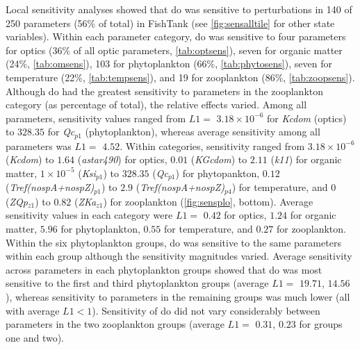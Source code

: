 \documentclass[letterpaper,12pt,oneside]{article}\usepackage[]{graphicx}\usepackage[]{color}
\begin{document}
Local sensitivity analyses showed that \ac{do} was sensitive to perturbations in 140 of 250 parameters (56\% of total) in FishTank (see \cref{fig:sensalltile} for other state variables). Within each parameter category, \ac{do} was sensitive to four parameters for optics (36\% of all optic parameters, \cref{tab:optsens}), seven for organic matter (24\%, \cref{tab:omsens}), 103 for phytoplankton (66\%, \cref{tab:phytosens}), seven for temperature (22\%, \cref{tab:tempsens}), and 19 for zooplankton (86\%, \cref{tab:zoopsens}). Although \ac{do} had the greatest sensitivity to parameters in the zooplankton category (as percentage of total), the relative effects varied. Among all parameters, sensitivity values ranged from $L1 = $ $3.18\times 10^{-6}$ for \textit{Kcdom} (optics) to $328.35$ for \textit{Qc$_{p1}$} (phytoplankton), whereas average sensitivity among all parameters was $L1 = $ $4.52$.  Within categories, sensitivity ranged from $3.18\times 10^{-6}$ (\textit{Kcdom}) to $1.64$ (\textit{astar490}) for optics, $0.01$ (\textit{KGcdom}) to $2.11$ (\textit{k11}) for organic matter, $1\times 10^{-5}$ (\textit{Ksi$_{p1}$}) to $328.35$ (\textit{Qc$_{p1}$}) for phytopankton, $0.12$ (\textit{Tref(nospA+nospZ)$_{p1}$}) to $2.9$ (\textit{Tref(nospA+nospZ)$_{p4}$}) for temperature, and $0$ (\textit{ZQp$_{z1}$}) to $0.82$ (\textit{ZKa$_{z1}$}) for zooplankton (\cref{fig:sensplo}, bottom).  Average sensitivity values in each category were $L1 = $ $0.42$ for optics, $1.24$ for organic matter, $5.96$ for phytoplankton, $0.55$ for temperature, and $0.27$ for zooplankton.  Within the six phytoplankton groups, \ac{do} was sensitive to the same parameters within each group although the sensitivity magnitudes varied. Average sensitivity across parameters in each phytoplankton groups showed that \ac{do} was most sensitive to the first and third phytoplankton groups (average $L1 = $ $19.71$, $14.56$), whereas sensitivity to parameters in the remaining groups was much lower (all with average $L1 < 1$). Sensitivity of \ac{do} did not vary considerably between parameters in the two zooplankton groups (average $L1 = $ $0.31$, $0.23$ for groups one and two).
\end{document}
